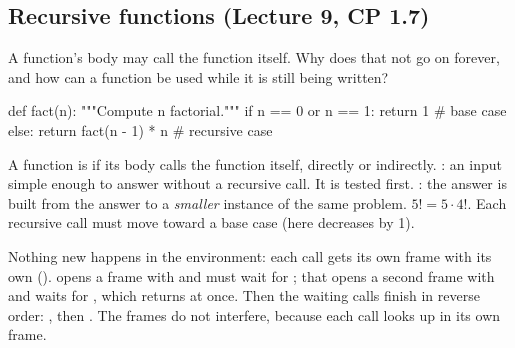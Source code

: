 \documentclass[10pt]{scrartcl}
\begin{document}
\subsection{Recursive functions (Lecture 9, CP 1.7)}
\begin{qbox}
  A function's body may call the function itself. Why does that not go on forever, and how can a function be used while it is still being written?
\end{qbox}
\begin{py}
def fact(n):
    """Compute n factorial."""
    if n == 0 or n == 1:
        return 1                  # base case
    else:
        return fact(n - 1) * n    # recursive case
\end{py}
\begin{itemize}
  \ii A function is  if its body calls the function itself, directly or indirectly.
  \ii {}: an input simple enough to answer without a recursive call. It is tested first.
  \ii {}: the answer is built from the answer to a \emph{smaller} instance of the same problem. $5!=5\cdot4!$.
  \ii Each recursive call must move toward a base case (here  decreases by 1).
\end{itemize}
\begin{ideabox}
Nothing new happens in the environment: each call gets its own frame with its own  ().  opens a frame with  and must wait for ; that opens a second frame with  and waits for , which returns  at once. Then the waiting calls finish in reverse order: , then . The frames do not interfere, because each call looks up  in its own frame.
\end{ideabox}
\end{document}
